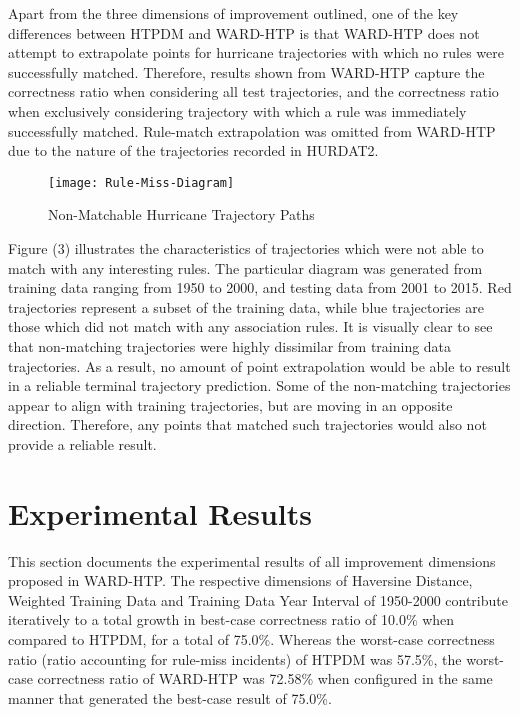 \documentclass[12pt,conference]{IEEEtran}
\begin{document}
Apart from the three dimensions of improvement outlined, one of the key differences between HTPDM and WARD-HTP is that WARD-HTP does not attempt to extrapolate points for hurricane trajectories with which no rules were successfully matched. Therefore, results shown from WARD-HTP capture the correctness ratio when considering all test trajectories, and the correctness ratio when exclusively considering trajectory with which a rule was immediately successfully matched. Rule-match extrapolation was omitted from WARD-HTP due to the nature of the trajectories recorded in HURDAT2.

\begin{figure}[htp]
\caption{Non-Matchable Hurricane Trajectory Paths}
\centering
\texttt{[image: Rule-Miss-Diagram]}
\end{figure}

Figure (3) illustrates the characteristics of trajectories which were not able to match with any interesting rules. The particular diagram was generated from training data ranging from 1950 to 2000, and testing data from 2001 to 2015. Red trajectories represent a subset of the training data, while blue trajectories are those which did not match with any association rules. It is visually clear to see that non-matching trajectories were highly dissimilar from training data trajectories. As a result, no amount of point extrapolation would be able to result in a reliable terminal trajectory prediction. Some of the non-matching trajectories appear to align with training trajectories, but are moving in an opposite direction. Therefore, any points that matched such trajectories would also not provide a reliable result.

\section{Experimental Results}

This section documents the experimental results of all improvement dimensions proposed in WARD-HTP. The respective dimensions of Haversine Distance, Weighted Training Data and Training Data Year Interval of 1950-2000 contribute iteratively to a total growth in best-case correctness ratio of 10.0\% when compared to HTPDM, for a total of 75.0\%. Whereas the worst-case correctness ratio (ratio accounting for rule-miss incidents) of HTPDM was 57.5\%, the worst-case correctness ratio of WARD-HTP was 72.58\% when configured in the same manner that generated the best-case result of 75.0\%. 
\end{document}
